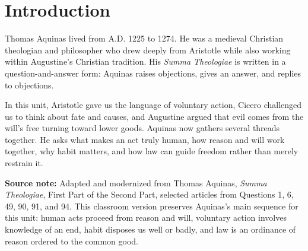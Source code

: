 \documentclass[12pt]{article}
\newcommand{\focusbox}[1]{%
\vspace{0.4em}\noindent\colorbox{gray!12}{\begin{minipage}{0.96\linewidth}#1\end{minipage}}\vspace{0.5em}}
\begin{document}
\section*{Introduction}
Thomas Aquinas lived from A.D. 1225 to 1274. He was a medieval Christian theologian and philosopher who drew deeply from Aristotle while also working within Augustine's Christian tradition. His \textit{Summa Theologiae} is written in a question-and-answer form: Aquinas raises objections, gives an answer, and replies to objections.

In this unit, Aristotle gave us the language of voluntary action, Cicero challenged us to think about fate and causes, and Augustine argued that evil comes from the will's free turning toward lower goods. Aquinas now gathers several threads together. He asks what makes an act truly human, how reason and will work together, why habit matters, and how law can guide freedom rather than merely restrain it.

\focusbox{\textbf{Source note:} Adapted and modernized from Thomas Aquinas, \textit{Summa Theologiae}, First Part of the Second Part, selected articles from Questions 1, 6, 49, 90, 91, and 94. This classroom version preserves Aquinas's main sequence for this unit: human acts proceed from reason and will, voluntary action involves knowledge of an end, habit disposes us well or badly, and law is an ordinance of reason ordered to the common good.}
\end{document}
